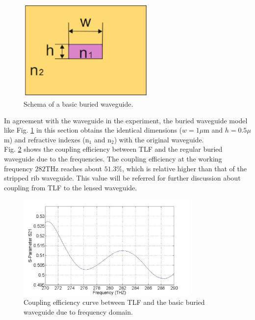 \begin{figure}[!ht]
\centering
\includegraphics[width=0.6\textwidth]{bilder/buried_waveguide}
\caption{Schema of a basic buried waveguide.}
\label{fig:buried_waveguide}
\end{figure}
In agreement with the waveguide in the experiment, the buried waveguide model like Fig. \ref{fig:buried_waveguide} in this section obtains the identical dimensions ($w=1\mu$m and $h=0.5\mu$m) and refractive indexes (n$_{1}$ and n$_{2}$) with the original waveguide.\\ 
Fig. \ref{fig:curve_coupling_basic_buried_waveguide} shows the coupling efficiency between TLF and the regular buried waveguide due to the frequencies. The coupling efficiency at the working frequency $282$THz reaches about $51.3\%$, which is relative higher than that of the stripped rib waveguide. This value will be referred for further discussion about coupling from TLF to the lensed waveguide.  
\begin{figure}[!ht]
\centering
\includegraphics[width=0.8\textwidth]{bilder/s21_sym_waveguide}
\caption{Coupling efficiency curve between TLF and the basic buried waveguide due to frequency domain.}
\label{fig:curve_coupling_basic_buried_waveguide}
\end{figure}
